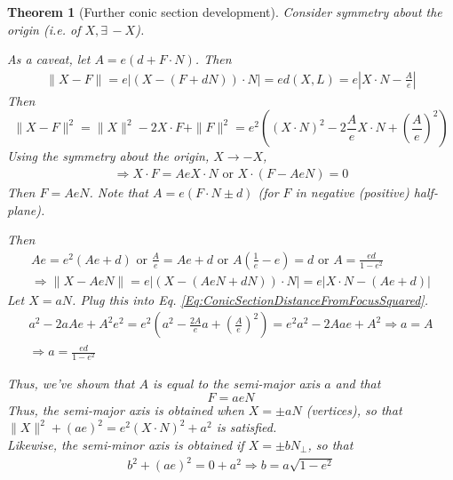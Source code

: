 \documentclass[10pt]{amsart}
\newtheorem{theorem}{Theorem}
\begin{document}
\begin{multicols*}{2}
\begin{theorem}[Further conic section development]
Consider symmetry about the origin (i.e. of $X, \exists \, -X$). 

As a caveat, let $A = e(d + F\cdot N)$. Then
\[
\begin{gathered}
	\| X - F \| = e | (X - (F + dN )) \cdot N | = e d(X, L) = e | X \cdot N - \frac{A}{e} | 
\end{gathered}
\]
Then
\begin{equation}\label{Eq:ConicSectionDistanceFromFocusSquared}
\| X - F \|^2 = \| X \|^2 - 2 X\cdot F + \| F \|^2 = e^2 ((X\cdot N)^2 - 2 \frac{A}{e} X\cdot N + \left( \frac{A}{e}\right)^2 )
\end{equation}
Using the symmetry about the origin, $X \to -X$, \\
\[
\begin{gathered}
	\Longrightarrow X\cdot F = Ae X\cdot N \text{ or } X \cdot (F - Ae N) = 0
\end{gathered}
\]
Then $F = AeN$. Note that $A = e(F\cdot N \pm d)$ (for $F$ in negative (positive) half-plane). 

Then
\[
\begin{gathered}
Ae = e^2 ( Ae + d) \text{ or } \frac{A}{e} = Ae + d \text{ or } A \left( \frac{1}{e} - e \right) = d \text{ or } A = \frac{ed}{1 - e^2 } \\
\Longrightarrow \| X - Ae N \| = e| (X - (AeN + dN)) \cdot N | = e|X\cdot N - (Ae + d) |
\end{gathered}
\]
Let $X = aN$. Plug this into Eq. \ref{Eq:ConicSectionDistanceFromFocusSquared}.
\begin{equation}\label{Eq:SemiMajorAxis}
\begin{gathered} 
a^2 - 2aA e + A^2 e^2 = e^2 (a^2 - \frac{2A}{e} a + \left( \frac{A}{e} \right)^2 ) = e^2 a^2 - 2Aae + A^2 \Longrightarrow a = A \\
\Longrightarrow a = \frac{ed}{1 - e^2 }
\end{gathered} 
\end{equation}

Thus, we've shown that $A$ is equal to the \emph{semi-major axis} $a$ and that 
\begin{equation}
\boxed{ F = aeN }
\end{equation}
Thus, the semi-major axis is obtained when $X = \pm aN$ (vertices), so that $\| X \|^2 + (ae)^2 = e^2 ( X\cdot N)^2 + a^2$ is satisfied. \\
Likewise, the semi-minor axis is obtained if $X = \pm bN_{\perp}$, so that
\begin{equation}\label{Eq:ConicSectionSemiMinorAxis}
\begin{gathered}
	b^2 + (ae)^2 = 0 + a^2 \Longrightarrow \boxed{ b = a \sqrt{ 1 - e^2 } }
\end{gathered} 
\end{equation}


\end{theorem}
\end{multicols*}
\end{document}
